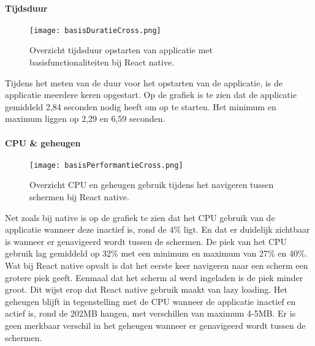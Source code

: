 \paragraph{Tijdsduur}
\begin{figure}[H]
    \centering
    \texttt{[image: basisDuratieCross.png]}
    \caption{Overzicht tijdsduur opstarten van applicatie met basisfunctionaliteiten bij React native.}
\end{figure}
Tijdens het meten van de duur voor het opstarten van de applicatie, 
is de applicatie meerdere keren opgestart. Op de grafiek is te zien dat de applicatie
gemiddeld 2,84 seconden nodig heeft om op te starten. Het minimum en maximum
liggen op 2,29 en 6,59 seconden.

\paragraph{CPU \& geheugen}
\begin{figure}[H]
    \centering
    \texttt{[image: basisPerformantieCross.png]}
    \caption{Overzicht CPU en geheugen gebruik tijdens het navigeren tussen schermen bij React native.}
\end{figure}
Net zoals bij native is op de grafiek te zien dat het CPU gebruik van de applicatie wanneer deze
inactief is, rond de 4\% ligt. En dat er duidelijk zichtbaar is wanneer er
genavigeerd wordt tussen de schermen. De piek van het CPU gebruik lag gemiddeld
op 32\% met een minimum en maximum van 27\% en 40\%. Wat bij React native opvalt is dat
het eerste keer navigeren naar een scherm een grotere piek geeft. Eenmaal dat het scherm 
al werd ingeladen is de piek minder groot. Dit wijst erop dat React native gebruik maakt van
lazy loading. Het geheugen blijft in tegenstelling
met de CPU wanneer de applicatie inactief en actief is, rond de 202MB hangen, met
verschillen van maximum 4-5MB. Er is geen merkbaar verschil in het geheugen wanneer
er genavigeerd wordt tussen de schermen.
